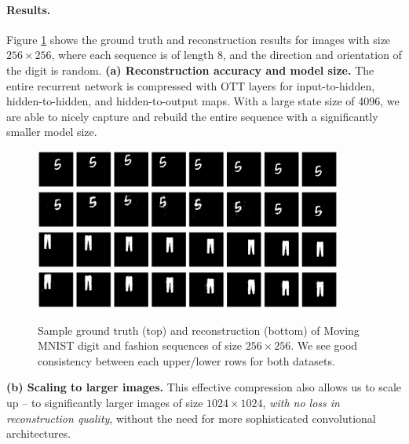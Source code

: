\paragraph{Results.} Figure \ref{fig:256digits} shows the ground truth and reconstruction
results for images with size $256 \times 256$, where each sequence is of length 8,
and the direction and orientation of the digit is random.
\textbf{(a) Reconstruction accuracy and model size.}
The entire recurrent network is compressed with OTT layers for input-to-hidden, hidden-to-hidden,
and hidden-to-output maps. With a large state size of 4096, we are able to nicely capture and
rebuild the entire sequence with a significantly smaller model size.
\begin{figure}
    \centering
    \includegraphics[width=0.9\textwidth,trim={0 1.5cm 0 1cm},clip]{4_ott/figs/mnist/DMNIST_gt.eps}
    \includegraphics[width=0.9\textwidth,trim={0 1cm 0 1.5cm},clip]{4_ott/figs/mnist/DMNIST_pd.eps}
    \includegraphics[width=0.9\textwidth,trim={0 1.5cm 0 1cm},clip]{4_ott/figs/mnist/FMNIST_gt.eps}
    \includegraphics[width=0.9\textwidth,trim={0 1cm 0 1.5cm},clip]{4_ott/figs/mnist/FMNIST_pd.eps}
    \caption[Moving MNIST reconstructions]{\label{fig:256digits} Sample ground truth (top) and reconstruction (bottom) of Moving MNIST digit and fashion sequences of size $256 \times 256$. We
    see good consistency between each upper/lower rows for both datasets.}
\end{figure}
\textbf{(b) Scaling to larger images.}
This effective compression also allows us to scale up --  to
significantly larger images of size $1024 \times 1024$, \textit{with no loss in reconstruction quality},
    without the need for more sophisticated convolutional architectures.

